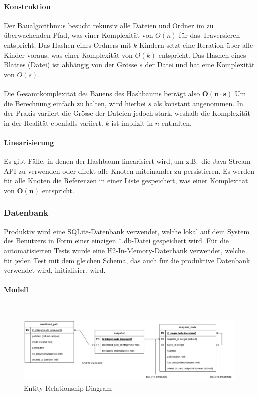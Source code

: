 \documentclass[a4paper,12pt]{report}
\begin{document}
    \paragraph*{Konstruktion}
    Der Baualgorithmus besucht rekursiv alle Dateien und Ordner im zu überwachenden Pfad,
    was einer Komplexität von $O(n)$ für das Traversieren entspricht.
    Das Hashen eines Ordners mit $k$ Kindern setzt eine Iteration über alle Kinder voraus, was einer Komplexität von $O(k)$ entspricht.
    Das Hashen eines Blattes (Datei) ist abhängig von der Grösse $s$ der Datei und hat eine Komplexität von $O(s)$.
    \\\\
    Die Gesamtkomplexität des Bauens des Hashbaums beträgt also $\boldsymbol{O(n \cdot s)}$
    Um die Berechnung einfach zu halten, wird hierbei $s$ als konstant angenommen.
    In der Praxis variiert die Grösse der Dateien jedoch stark, weshalb die Komplexität in der Realität ebenfalls variiert.
    $k$ ist implizit in $n$ enthalten.

    \paragraph*{Linearisierung}
    Es gibt Fälle, in denen der Hashbaum linearisiert wird, um z.B.\ die Java Stream API zu verwenden oder direkt alle Knoten miteinander zu persistieren.
    Es werden für alle Knoten die Referenzen in einer Liste gespeichert, was einer Komplexität von $\boldsymbol{O(n)}$ entspricht.

    \clearpage

    \subsubsection{Datenbank}\label{subsubsec:realisierung-datenbank}
    Produktiv wird eine SQLite-Datenbank verwendet, welche lokal auf dem System des Benutzers in Form einer einzigen *.db-Datei gespeichert wird.
    Für die automatisierten Tests wurde eine H2-In-Memory-Datenbank verwendet, welche für jeden Test mit dem gleichen Schema,
    das auch für die produktive Datenbank verwendet wird, initialisiert wird.

    \paragraph*{Modell}\mbox{}\\
    \begin{figure}[h]
        \centering
        \includegraphics[width=1\textwidth]{assets/erd}
        \caption{Entity Relationship Diagram}
    \end{figure}
\end{document}
